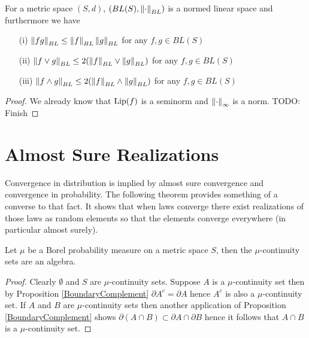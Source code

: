 \begin{prop}\label{BoundedLipschitzDualNormProperties}For a metric space $(S,d)$, $(BL(S), \left \lVert \cdot \right \rVert_{BL})$ is a normed linear space and furthermore we have 
\begin{itemize}
\item[(i)] $\left \lVert fg \right \rVert_{BL} \leq \left \lVert f \right \rVert_{BL} \left \lVert g \right \rVert_{BL}$ for any $f,g \in BL(S)$
\item[(ii)] $\left \lVert f \vee g \right \rVert_{BL} \leq 2(\left \lVert f \right \rVert_{BL} \vee \left \lVert g \right \rVert_{BL})$ for any $f,g \in BL(S)$
\item[(iii)] $\left \lVert f \wedge g \right \rVert_{BL} \leq 2(\left \lVert f \right \rVert_{BL} \wedge \left \lVert g \right \rVert_{BL})$ for any $f,g \in BL(S)$
\end{itemize}
\end{prop}
\begin{proof}
We already know that $\operatorname*{Lip}(f)$ is a seminorm and $\left \lVert \cdot \right \rVert_\infty$ is a norm.  
TODO: Finish
\end{proof}

\section{Almost Sure Realizations}

Convergence in distribution is implied by almost sure convergence and convergence in probability.  The following theorem provides something of a converse to that fact.  It shows that when laws converge there exist realizations of those laws as random elements so that the elements converge everywhere (in particular almost surely).  

\begin{lem}\label{ContinuitySetsAlgebra}Let $\mu$ be a Borel probability measure on a metric space
  $S$, then the $\mu$-continuity sets are an algebra.
\end{lem}
\begin{proof}
Clearly $\emptyset$ and $S$ are $\mu$-continuity sets.  Suppose $A$ is a $\mu$-continuity set then by Proposition \ref{BoundaryComplement} $\partial A^c = \partial A$ hence $A^c$ is also a $\mu$-continuity set.  If $A$ and $B$ are $\mu$-continuity sets then another application of Proposition \ref{BoundaryComplement} shows $\partial (A \cap B) \subset \partial A \cap \partial B$ hence it follows that $A \cap B$ is a $\mu$-continuity set.
\end{proof}

